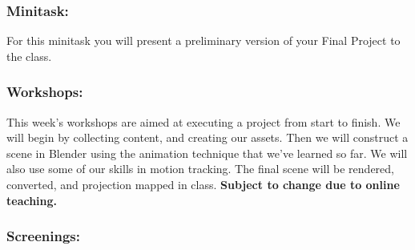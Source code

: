 \documentclass[10pt,letter,english]{article}
\begin{document}
\hypertarget{minitask-4}{%
      \subsubsection*{\texorpdfstring{Minitask:
            }{Minitask: }}\label{minitask-4}}

For this minitask you will present a preliminary version of your Final Project to the class.

\hypertarget{workshops-4}{%
      \subsubsection*{Workshops:}\label{workshops-4}}

This week's workshops are aimed at executing a project from start to finish. We will begin by collecting content, and creating our assets. Then we will construct a scene in Blender using the animation technique that we've learned so far. We will also use some of our skills in motion tracking. The final scene will be rendered, converted, and projection mapped in class. \textbf{Subject to change due to online teaching.}

\subsubsection*{Screenings:}
\end{document}
